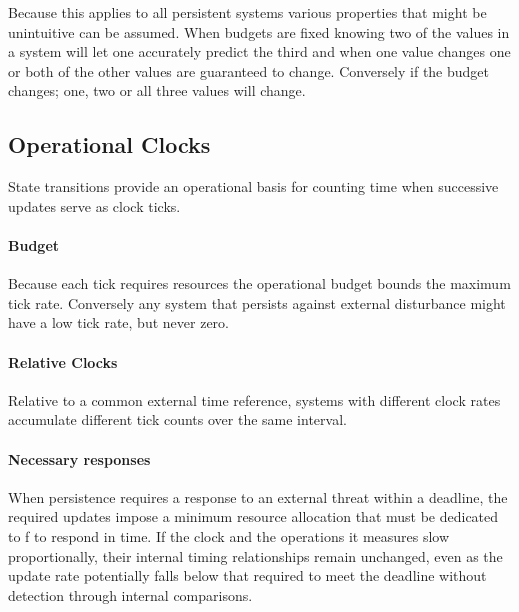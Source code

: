 Because this applies to all persistent systems various properties that might be unintuitive can be assumed. When budgets are fixed knowing two of the values in a system will let one accurately predict the third and when one value changes one or both of the other values are guaranteed to change. Conversely if the budget changes; one, two or all three values will change.

\subsection{Operational Clocks}
\label{subsec:operational_clocks}
State transitions provide an operational basis for counting time when successive updates serve as clock ticks. 

\paragraph{Budget}
Because each tick requires resources the operational budget bounds the maximum tick rate.  Conversely any system that persists against external disturbance might have a low tick rate, but never zero.

\paragraph{Relative Clocks}
Relative to a common external time reference, systems with different clock rates accumulate different tick counts over the same interval.

\paragraph{Necessary responses}
When persistence requires a response to an external threat within a deadline, the required updates impose a minimum resource allocation that must be dedicated to f to respond in time. If the clock and the operations it measures slow proportionally, their internal timing relationships remain unchanged, even as the update rate potentially falls below that required to meet the deadline without detection through internal comparisons.